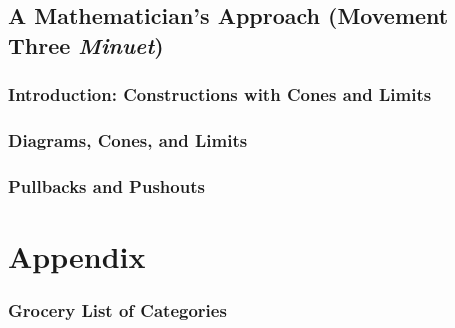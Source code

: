 \documentclass{amsart}
\theoremstyle{plain}
\theoremstyle{definition}
\begin{document}
\chapter{A Mathematician's Approach (Movement Three \emph{Minuet})}
\section{Introduction: Constructions with Cones and Limits}

\section{Diagrams, Cones, and Limits}

\section{Pullbacks and Pushouts}




%
%

\part*{Appendix}
\begin{appendix}
\section{Grocery List of Categories}

\nocite{*}


\end{appendix}
\end{document}
